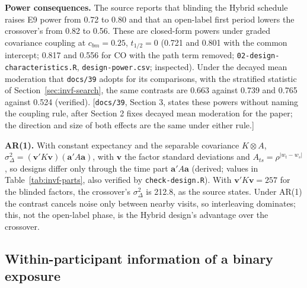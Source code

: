 \documentclass[11pt]{article}
\newcommand{\note}[1]{\textcolor{blue!60!black}{\small [#1]}}
\newcommand{\code}[1]{\texttt{#1}}
\begin{document}
\textbf{Power consequences.} The source reports that blinding the Hybrid
schedule raises E9 power from 0.72 to 0.80 and that an open-label first
period lowers the crossover's from 0.82 to 0.56. These are closed-form
powers under graded covariance coupling at $c_{bm} = 0.25$, $t_{1/2} = 0$
(0.721 and 0.801 with the common intercept; 0.817 and 0.556 for CO with
the path term removed; \code{02-design-characteristics.R},
\code{design-power.csv}; inspected). Under the decayed mean moderation
that \code{docs/39} adopts for its comparisons, with the stratified
statistic of Section~\ref{sec:invf-search}, the same contrasts are 0.663
against 0.739 and 0.765 against 0.524 (verified). \note{\code{docs/39},
Section 3, states these powers without naming the coupling rule, after
Section 2 fixes decayed mean moderation for the paper; the direction and
size of both effects are the same under either rule.}

\textbf{AR(1).} With constant expectancy and the separable covariance
$K \otimes A$, $\sigma_\Delta^2 = (\mathbf v'K\mathbf v)(\mathbf a'A\mathbf a)$,
with $\mathbf v$ the factor standard deviations and $A_{ts} =
\rho^{|w_t - w_s|}$, so designs differ only through the time part
$\mathbf a'A\mathbf a$ (derived; values in Table~\ref{tab:invf-parts},
also verified by \code{check-design.R}). With $\mathbf v'K\mathbf v =
257$ for the blinded factors, the crossover's $\sigma_\Delta^2$ is 212.8, as the
source states. Under AR(1) the contrast cancels noise only between
nearby visits, so interleaving dominates; this, not the open-label
phase, is the Hybrid design's advantage over the crossover.

\subsection{Within-participant information of a binary exposure}
\label{sec:inva-ssw}
\end{document}
